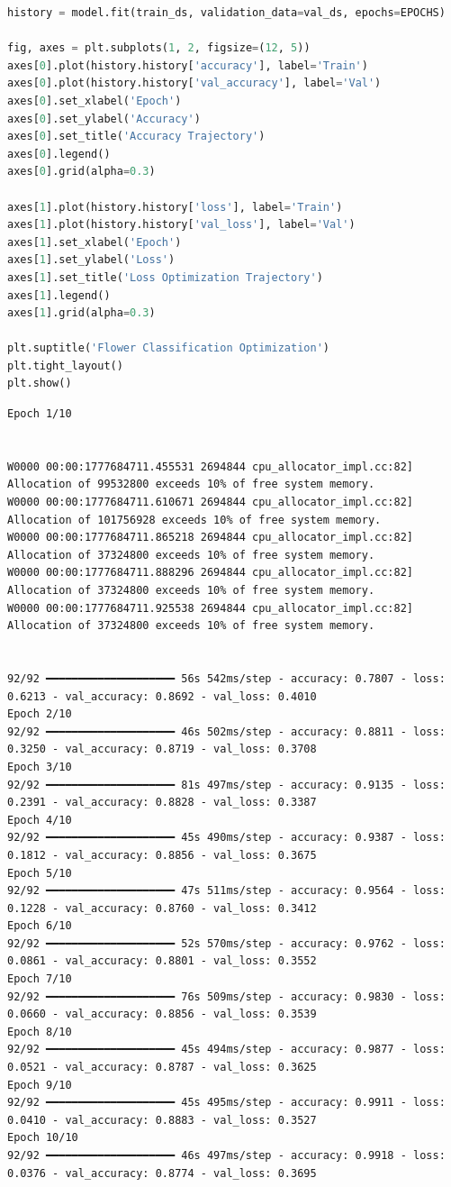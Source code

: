 \begin{lstlisting}[language=Python]
history = model.fit(train_ds, validation_data=val_ds, epochs=EPOCHS)

fig, axes = plt.subplots(1, 2, figsize=(12, 5))
axes[0].plot(history.history['accuracy'], label='Train')
axes[0].plot(history.history['val_accuracy'], label='Val')
axes[0].set_xlabel('Epoch')
axes[0].set_ylabel('Accuracy')
axes[0].set_title('Accuracy Trajectory')
axes[0].legend()
axes[0].grid(alpha=0.3)

axes[1].plot(history.history['loss'], label='Train')
axes[1].plot(history.history['val_loss'], label='Val')
axes[1].set_xlabel('Epoch')
axes[1].set_ylabel('Loss')
axes[1].set_title('Loss Optimization Trajectory')
axes[1].legend()
axes[1].grid(alpha=0.3)

plt.suptitle('Flower Classification Optimization')
plt.tight_layout()
plt.show()
\end{lstlisting}

\begin{lstlisting}
Epoch 1/10


W0000 00:00:1777684711.455531 2694844 cpu_allocator_impl.cc:82] Allocation of 99532800 exceeds 10% of free system memory.
W0000 00:00:1777684711.610671 2694844 cpu_allocator_impl.cc:82] Allocation of 101756928 exceeds 10% of free system memory.
W0000 00:00:1777684711.865218 2694844 cpu_allocator_impl.cc:82] Allocation of 37324800 exceeds 10% of free system memory.
W0000 00:00:1777684711.888296 2694844 cpu_allocator_impl.cc:82] Allocation of 37324800 exceeds 10% of free system memory.
W0000 00:00:1777684711.925538 2694844 cpu_allocator_impl.cc:82] Allocation of 37324800 exceeds 10% of free system memory.


92/92 ━━━━━━━━━━━━━━━━━━━━ 56s 542ms/step - accuracy: 0.7807 - loss: 0.6213 - val_accuracy: 0.8692 - val_loss: 0.4010
Epoch 2/10
92/92 ━━━━━━━━━━━━━━━━━━━━ 46s 502ms/step - accuracy: 0.8811 - loss: 0.3250 - val_accuracy: 0.8719 - val_loss: 0.3708
Epoch 3/10
92/92 ━━━━━━━━━━━━━━━━━━━━ 81s 497ms/step - accuracy: 0.9135 - loss: 0.2391 - val_accuracy: 0.8828 - val_loss: 0.3387
Epoch 4/10
92/92 ━━━━━━━━━━━━━━━━━━━━ 45s 490ms/step - accuracy: 0.9387 - loss: 0.1812 - val_accuracy: 0.8856 - val_loss: 0.3675
Epoch 5/10
92/92 ━━━━━━━━━━━━━━━━━━━━ 47s 511ms/step - accuracy: 0.9564 - loss: 0.1228 - val_accuracy: 0.8760 - val_loss: 0.3412
Epoch 6/10
92/92 ━━━━━━━━━━━━━━━━━━━━ 52s 570ms/step - accuracy: 0.9762 - loss: 0.0861 - val_accuracy: 0.8801 - val_loss: 0.3552
Epoch 7/10
92/92 ━━━━━━━━━━━━━━━━━━━━ 76s 509ms/step - accuracy: 0.9830 - loss: 0.0660 - val_accuracy: 0.8856 - val_loss: 0.3539
Epoch 8/10
92/92 ━━━━━━━━━━━━━━━━━━━━ 45s 494ms/step - accuracy: 0.9877 - loss: 0.0521 - val_accuracy: 0.8787 - val_loss: 0.3625
Epoch 9/10
92/92 ━━━━━━━━━━━━━━━━━━━━ 45s 495ms/step - accuracy: 0.9911 - loss: 0.0410 - val_accuracy: 0.8883 - val_loss: 0.3527
Epoch 10/10
92/92 ━━━━━━━━━━━━━━━━━━━━ 46s 497ms/step - accuracy: 0.9918 - loss: 0.0376 - val_accuracy: 0.8774 - val_loss: 0.3695
\end{lstlisting}

